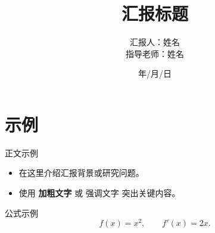 \documentclass[10pt,aspectratio=169]{beamer}
\title[汇报标题]{汇报标题}
\author[姓名]{\texorpdfstring{%
  汇报人：姓名
  \vspace{0.2cm}\\
  指导老师：姓名}{姓名}}
\date[年/月/日]{年/月/日}
\begin{document}
\begin{frame}
  \titlepage
\end{frame}

\section{示例}
\begin{frame}{正文示例}
  \begin{itemize}
    \item 在这里介绍汇报背景或研究问题。
    \vspace{0.2cm}
    \item 使用 \textbf{加粗文字} 或 \alert{强调文字} 突出关键内容。
  \end{itemize}

  \vspace{0.3cm}
  \begin{block}{公式示例}
    \[
      f(x) = x^2, \qquad f'(x) = 2x.
    \]
  \end{block}
\end{frame}
\end{document}
